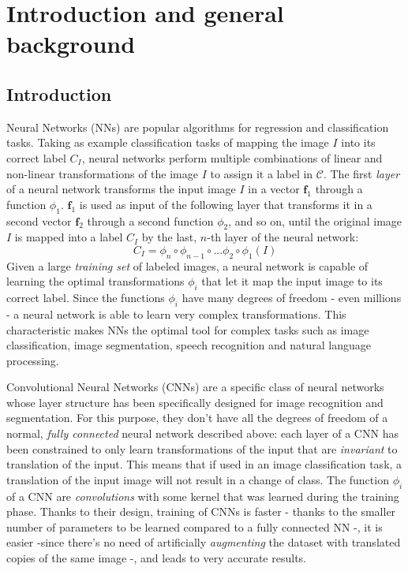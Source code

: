 

\setcounter{page}{1}



\section {Introduction and general background} 

\subsection{Introduction}

Neural Networks (NNs) are popular algorithms for regression and classification tasks. Taking as example classification tasks of mapping the image $I$ into its correct label $C_I$, neural networks perform multiple combinations of linear and non-linear transformations of the image $I$ to assign it a label in $\mathcal C$.  The first \textit{layer} of a neural network transforms the input image $I$ in a vector $\mathbf f_1$ through a function $\phi_1$. $\mathbf f_1$ is used as input of the following layer that transforms it in a second vector $\mathbf f_2$ through a second function $\phi_2$, and so on, until the original image $I$ is mapped into a label $C_I$ by the last, $n$-th layer of the neural network:
$$C_I = \phi_n \circ \phi_{n-1}\circ ... \phi_2\circ\phi_1 (I)$$
 Given a large \textit{training set} of labeled images, a neural network is capable of learning the optimal transformations $\phi_i$ that let it map the input image to its correct label. Since the functions $\phi_i$ have many degrees of freedom - even millions - a neural network is able to learn very complex transformations. This characteristic makes NNs the optimal tool for complex tasks such as image classification, image segmentation, speech recognition and natural language processing.
 
Convolutional Neural Networks (CNNs) are a specific class of neural networks whose layer structure has been specifically designed for image recognition and segmentation. For this purpose, they don't have all the degrees of freedom of a normal, \textit{fully connected} neural network described above: each layer of a CNN has been constrained to only learn transformations of the input that are \textit{invariant} to translation of the input. This means that if used in an image classification task, a translation of the input image will not result in a change of class. The function $\phi_i$ of a CNN are \textit{convolutions} with some kernel that was learned during the training phase. Thanks to their design, training of CNNs is faster - thanks to the smaller number of parameters to be learned compared to a fully connected NN -, it is easier -since there's no need of artificially \textit{augmenting} the dataset with translated copies of the same image -, and leads to very accurate results.

